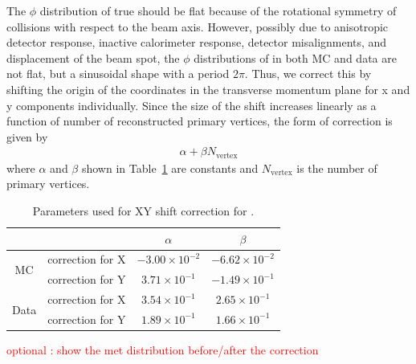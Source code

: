 The $\phi$ distribution of true \met{} should be flat because of the rotational 
symmetry of collisions with respect to the beam axis. However, possibly due to 
anisotropic detector response, inactive calorimeter response, detector misalignments, 
and displacement of the beam spot, the $\phi$ distributions of \met{} in both 
MC and data are not flat, but a sinusoidal shape with a period $2\pi$. 
Thus, we correct this by shifting the origin of the coordinates 
in the transverse momentum plane for x and y components individually. 
Since the size of the shift increases 
linearly as a function of number of reconstructed primary vertices, 
the form of correction is given by 
\begin{eqnarray} 
\alpha + \beta N_{\textrm{vertex}}
\end{eqnarray} 
where $\alpha$ and $\beta$ shown in Table~\ref{tab:metxycorrection} are constants 
and $N_{\textrm{vertex}}$ is the number of primary vertices. 
\begin{table}[htp] 
\begin{center} 
\begin{tabular}{c||c|c|c} 
\hline 
                       &                  & $\alpha$ &  $\beta$  \\
\hline \hline 
\multirow{2}{*}{MC}    & correction for X & $-3.00 \times 10^{-2}$ & $-6.62\times 10^{-2}$  \\
                       & correction for Y & $3.71\times 10^{-1}$   & $-1.49\times 10^{-1}$  \\
\hline 
\multirow{2}{*}{Data}  & correction for X & $3.54\times 10^{-1}$   & $2.65\times 10^{-1}$   \\
                       & correction for Y & $1.89\times 10^{-1}$   & $1.66\times 10^{-1}$   \\
\hline 
\end{tabular} 
\caption{Parameters used for XY shift correction for \met.} 
\label{tab:metxycorrection} 
\end{center} 
\end{table} 
\textcolor{red}{optional : show the met distribution before/after the correction}


